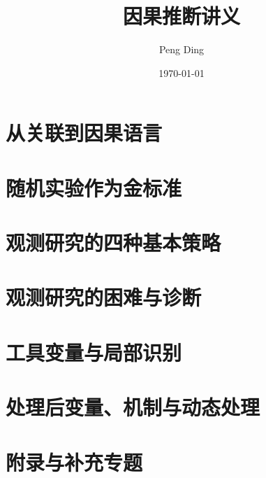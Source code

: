 \documentclass[12pt]{amsbook}
\title{因果推断讲义}
\author{Peng Ding}
\date{\today}
\theoremstyle{plain}
\begin{document}
\maketitle
\tableofcontents



\part{从关联到因果语言}



\part{随机实验作为金标准}








\part{观测研究的四种基本策略}







\part{观测研究的困难与诊断}






\part{工具变量与局部识别}






\part{处理后变量、机制与动态处理}





\appendix
\part{附录与补充专题}








\end{document}
